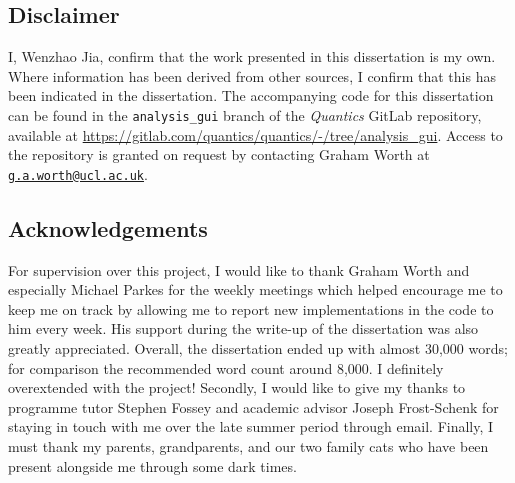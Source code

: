 \documentclass[12pt]{article}
\begin{document}
\subsection*{Disclaimer}
I, Wenzhao Jia, confirm that the work presented in this dissertation is my own. Where information has been derived from other sources, I confirm that this has been indicated in the dissertation.
\vspace{0.5cm}
\newline The accompanying code for this dissertation can be found in the \texttt{analysis\_gui} branch of the \textit{Quantics} GitLab repository, available at \url{https://gitlab.com/quantics/quantics/-/tree/analysis_gui}. Access to the repository is granted on request by contacting Graham Worth at \href{mailto:g.a.worth@ucl.ac.uk}{\texttt{g.a.worth@ucl.ac.uk}}.

\subsection*{Acknowledgements}

For supervision over this project, I would like to thank Graham Worth and especially Michael Parkes for the weekly meetings which helped encourage me to keep me on track by allowing me to report new implementations in the code to him every week. His support during the write-up of the dissertation was also greatly appreciated. Overall, the dissertation ended up with almost 30,000 words; for comparison the recommended word count around 8,000. I definitely overextended with the project!
\vspace{0.5cm}
\newline Secondly, I would like to give my thanks to programme tutor Stephen Fossey and academic advisor Joseph Frost-Schenk for staying in touch with me over the late summer period through email. Finally, I must thank my parents, grandparents, and our two family cats who have been present alongside me through some dark times.

\vspace{2.5cm}
\end{document}
